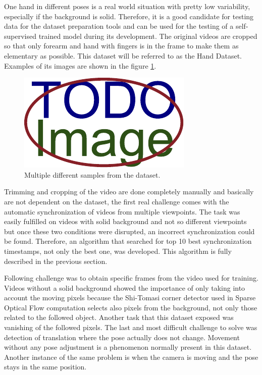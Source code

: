One hand in different poses is a real world situation with pretty low variability, especially if the background is solid. Therefore, it is a good candidate for testing data for the dataset preparation tools and can be used for the testing of a self-supervised trained model during its development. The original videos are cropped so that only forearm and hand with fingers is in the frame to make them as elementary as possible. This dataset will be referred to as the Hand Dataset. Examples of its images are shown in the figure \ref{fig:dataset-hand-simple-example}.

\begin{figure}[ht]
    \centering
    \includegraphics{figures/placeholder.pdf}
    \caption{Multiple different samples from the dataset.}
    \label{fig:dataset-hand-simple-example}
\end{figure}

Trimming and cropping of the video are done completely manually and basically are not dependent on the dataset, the first real challenge comes with the automatic synchronization of videos from multiple viewpoints. The task was easily fulfilled on videos with solid background and not so different viewpoints but once these two conditions were disrupted, an incorrect synchronization could be found. Therefore, an algorithm that searched for top 10 best synchronization timestamps, not only the best one, was developed. This algorithm is fully described in the previous section.

Following challenge was to obtain specific frames from the video used for training. Videos without a solid background showed the importance of only taking into account the moving pixels because the Shi-Tomasi corner detector used in Sparse Optical Flow computation selects also pixels from the background, not only those related to the followed object. Another task that this dataset exposed was vanishing of the followed pixels. The last and most difficult challenge to solve was detection of translation where the pose actually does not change. Movement without any pose adjustment is a phenomenon normally present in this dataset. Another instance of the same problem is when the camera is moving and the pose stays in the same position.

